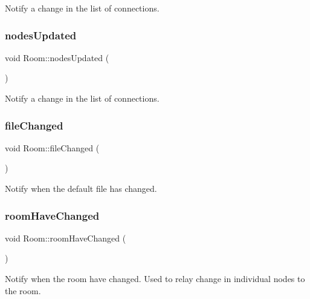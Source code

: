 Notify a change in the list of connections. \mbox{\label{classRoom_a8261085c6843f3b85d403284b39f92ba}} 
\subsubsection{\texorpdfstring{nodes\+Updated}{nodesUpdated}}
{\footnotesize\ttfamily void Room\+::nodes\+Updated (\begin{DoxyParamCaption}{ }\end{DoxyParamCaption})\hspace{0.3cm}{\ttfamily [signal]}}

Notify a change in the list of connections. \mbox{\label{classRoom_abc28a6555cb3e3543eecb65095ee89b7}} 
\subsubsection{\texorpdfstring{file\+Changed}{fileChanged}}
{\footnotesize\ttfamily void Room\+::file\+Changed (\begin{DoxyParamCaption}{ }\end{DoxyParamCaption})\hspace{0.3cm}{\ttfamily [signal]}}

Notify when the default file has changed. \mbox{\label{classRoom_ae37847fde9763f0561150f8bcfa0b550}} 
\subsubsection{\texorpdfstring{room\+Have\+Changed}{roomHaveChanged}}
{\footnotesize\ttfamily void Room\+::room\+Have\+Changed (\begin{DoxyParamCaption}{ }\end{DoxyParamCaption})\hspace{0.3cm}{\ttfamily [signal]}}

Notify when the room have changed. Used to relay change in individual nodes to the room. \mbox{\label{classRoom_abe1f81891e69cd6b511bbf18d7ce38c2}} 
